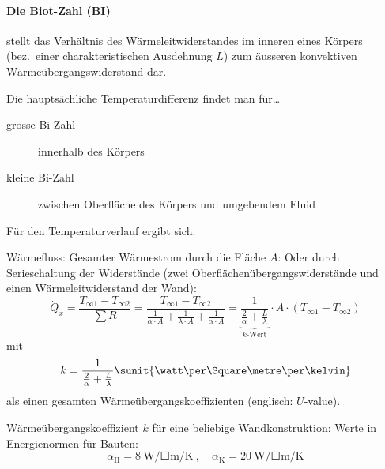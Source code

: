 		\paragraph{Die Biot-Zahl (BI)} %
			stellt das Verhältnis des Wär\-me\-leit\-wi\-der\-stan\-des im inneren eines Körpers (bez.~einer charakteristischen Ausdehnung $L$) zum äusseren konvektiven Wärme\-über\-gangswiderstand dar.
			
			Die hauptsächliche Temperaturdifferenz findet man für…
			\begin{description}
				\item[grosse Bi-Zahl] innerhalb des Körpers
				\item[kleine Bi-Zahl] zwischen Oberfläche des Körpers und umgebendem Fluid
			\end{description}
		
		Für den Temperaturverlauf ergibt sich:
		
		Wärmefluss:
		Gesamter Wärmestrom durch die Fläche $A$:
		Oder durch Serieschaltung der Wider\-stände (zwei Ober\-flächen\-über\-gangs\-wider\-stände und einen Wärme\-leit\-wider\-stand der Wand):
		\[
			\dot Q_x = \frac{T_{\infty 1} - T_{\infty 2}}{\sum R} = \frac{T_{\infty 1} - T_{\infty 2}}{\frac{1}{\alpha \cdot A} + \frac{1}{\lambda \cdot A} + \frac{1}{\alpha \cdot A}} = \underbrace{\frac{1}{\frac{2}{\alpha} + \frac{L}{\lambda}}}_\text{$k$-Wert} \cdot A \cdot (T_{\infty 1} - T_{\infty 2})
		\]
		mit \[
			k = \frac{1}{\frac{2}{\alpha} + \frac{L}{\lambda}} \sunit{\watt\per\Square\metre\per\kelvin}
		\] als einen gesamten Wärmeübergangskoeffizienten (englisch: $U$-value).
		
		Wärmeübergangskoeffizient $k$ für eine beliebige Wandkonstruktion:
		Werte in Energienormen für Bauten:
		\begin{equation*}
			\alpha_\text{H} = \SI[fraction=nicefrac]{8}{\watt\per\Square\metre\per\kelvin} \ , \quad
			\alpha_\text{K} = \SI[fraction=nicefrac]{20}{\watt\per\Square\metre\per\kelvin}
		\end{equation*}
